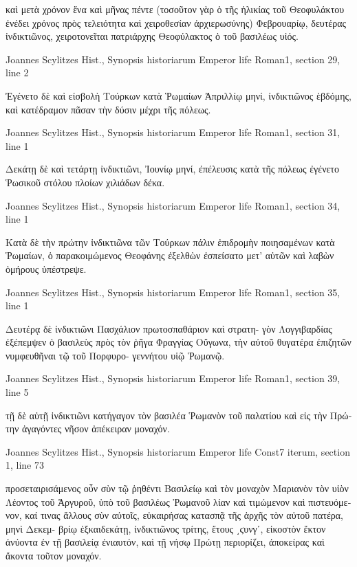 \documentclass[12pt,letterpaper,twoside,final]{memoir}
\begin{document}
\begin{greek}
                                                       καὶ μετὰ χρόνον ἕνα 
καὶ μῆνας πέντε (τοσοῦτον γὰρ ὁ τῆς ἡλικίας τοῦ Θεοφυλάκτου ἐνέδει 
χρόνος πρὸς τελειότητα καὶ χειροθεσίαν ἀρχιερωσύνης) Φεβρουαρίῳ, 
δευτέρας ἰνδικτιῶνος, χειροτονεῖται πατριάρχης Θεοφύλακτος ὁ τοῦ 
βασιλέως υἱός. 



Joannes Scylitzes Hist., Synopsis historiarum 
Emperor life Roman1, section 29, line 2

Ἐγένετο δὲ καὶ εἰσβολὴ Τούρκων κατὰ Ῥωμαίων Ἀπριλλίῳ 
μηνί, ἰνδικτιῶνος ἑβδόμης, καὶ κατέδραμον πᾶσαν τὴν δύσιν μέχρι τῆς 
πόλεως. 



Joannes Scylitzes Hist., Synopsis historiarum 
Emperor life Roman1, section 31, line 1

Δεκάτῃ δὲ καὶ τετάρτῃ ἰνδικτιῶνι, Ἰουνίῳ μηνί, ἐπέλευσις κατὰ 
τῆς πόλεως ἐγένετο Ῥωσικοῦ στόλου πλοίων χιλιάδων δέκα. 



Joannes Scylitzes Hist., Synopsis historiarum 
Emperor life Roman1, section 34, line 1

Κατὰ δὲ τὴν πρώτην ἰνδικτιῶνα τῶν Τούρκων πάλιν ἐπιδρομὴν 
ποιησαμένων κατὰ Ῥωμαίων, ὁ παρακοιμώμενος Θεοφάνης ἐξελθὼν 
ἐσπείσατο μετ' αὐτῶν καὶ λαβὼν ὁμήρους ὑπέστρεψε. 



Joannes Scylitzes Hist., Synopsis historiarum 
Emperor life Roman1, section 35, line 1

Δευτέρᾳ δὲ ἰνδικτιῶνι Πασχάλιον πρωτοσπαθάριον καὶ στρατη-
γὸν Λογγιβαρδίας ἐξέπεμψεν ὁ βασιλεὺς πρὸς τὸν ῥῆγα Φραγγίας 
Οὔγωνα, τὴν αὐτοῦ θυγατέρα ἐπιζητῶν νυμφευθῆναι τῷ τοῦ Πορφυρο-
γεννήτου υἱῷ Ῥωμανῷ. 



Joannes Scylitzes Hist., Synopsis historiarum 
Emperor life Roman1, section 39, line 5

                                                              τῇ δὲ αὐτῇ ἰνδικτιῶνι 
κατήγαγον τὸν βασιλέα Ῥωμανὸν τοῦ παλατίου καὶ εἰς τὴν Πρώτην 
ἀγαγόντες νῆσον ἀπέκειραν μοναχόν. 



Joannes Scylitzes Hist., Synopsis historiarum 
Emperor life Const7 iterum, section 1, line 73

              προσεταιρισάμενος οὖν σὺν τῷ ῥηθέντι Βασιλείῳ καὶ τὸν 
μοναχὸν Μαριανὸν τὸν υἱὸν Λέοντος τοῦ Ἀργυροῦ, ὑπὸ τοῦ βασιλέως 
Ῥωμανοῦ λίαν καὶ τιμώμενον καὶ πιστευόμενον, καί τινας ἄλλους σὺν 
αὐτοῖς, εὐκαιρήσας κατασπᾷ τῆς ἀρχῆς τὸν αὐτοῦ πατέρα, μηνὶ Δεκεμ-
βρίῳ ἑξκαιδεκάτῃ, ἰνδικτιῶνος τρίτης, ἔτους ͵ϛυνγʹ, εἰκοστὸν ἕκτον 
ἀνύοντα ἐν τῇ βασιλείᾳ ἐνιαυτόν, καὶ τῇ νήσῳ Πρώτῃ περιορίζει, 
ἀποκείρας καὶ ἄκοντα τοῦτον μοναχόν. 




\end{greek}
\end{document}
